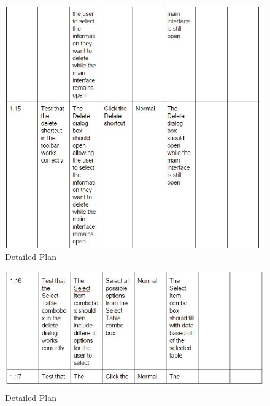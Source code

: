 \begin{itemize}
\begin{figure}[H]
    \includegraphics[width=\textwidth]{DP9.JPG}
    \caption{Detailed Plan} \label{fig:VDetailed Plan}
\end{figure}

\begin{figure}[H]
    \includegraphics[width=\textwidth]{DP10.JPG}
    \caption{Detailed Plan} \label{fig:VDetailed Plan}
\end{figure}


\end{itemize}
